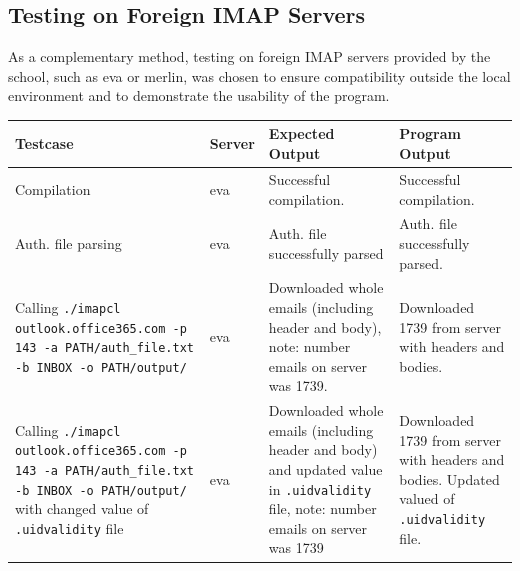 \documentclass[a4paper,11pt]{article}
\begin{document}
\subsection{Testing on Foreign IMAP Servers}
As a complementary method, testing on foreign IMAP servers provided by the school, such as eva 
or merlin, was chosen to ensure compatibility outside the local environment and to demonstrate 
the usability of the program.

\begin{center}
    \vspace{0.5cm} %
    \begin{tabularx}{\textwidth}{|>{\raggedright\arraybackslash}p{5cm}|>{\raggedright\arraybackslash}p{1cm}|>{\raggedright\arraybackslash}p{5cm}|>{\raggedright\arraybackslash}X|}
        \hline
        \textbf{Testcase} & \textbf{Server} & \textbf{Expected Output} & \textbf{Program Output} \\
        \hline
        Compilation & eva & Successful compilation. & Successful compilation. \\
        \hline
        Auth. file parsing & eva & Auth. file successfully parsed & Auth. file successfully parsed. \\
        \hline
        Calling \texttt{./imapcl outlook.office365.com -p 143 -a PATH/auth\_file.txt -b INBOX -o PATH/output/} & eva & Downloaded whole emails (including header and body), note: number emails on server was 1739. & Downloaded 1739 from server with headers and bodies. \\
        \hline
        Calling \texttt{./imapcl outlook.office365.com -p 143 -a PATH/auth\_file.txt -b INBOX -o PATH/output/} with changed value of \texttt{.uidvalidity} file & eva & Downloaded whole emails (including header and body) and updated value in \texttt{.uidvalidity} file, note: number emails on server was 1739 & Downloaded 1739 from server with headers and bodies. Updated valued of \texttt{.uidvalidity} file. \\
        \hline
    \end{tabularx}
    \vspace{0.5cm} %
\end{center}
\end{document}
